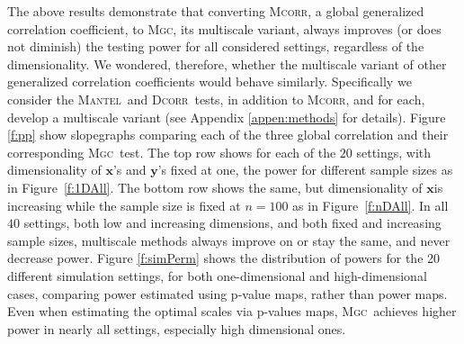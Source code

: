 \documentclass[11pt]{article}
\newcommand{\note}[2][]{\added[#1,remark={#2}]{}}
\providecommand{\sct}[1]{{\normalfont\textsc{#1}}}
\providecommand{\mb}[1]{\boldsymbol{#1}}
\newcommand{\Mgc}{\sct{Mgc}}
\newcommand{\Hhg}{\sct{Hhg}}
\newcommand{\Dcorr}{\sct{Dcorr}}
\newcommand{\Mcorr}{\sct{Mcorr}}
\newcommand{\Mantel}{\sct{Mantel}}
\newcommand{\cs}[1]{{\note{cs: #1}}}
\newcommand{\mbx}{\ensuremath{\mb{x}}}
\newcommand{\mby}{\ensuremath{\mb{y}}}
\begin{document}
The above results demonstrate that converting \Mcorr, a global generalized correlation coefficient, to \Mgc, its multiscale variant, always improves (or does not diminish) the testing power for all considered settings, regardless of the dimensionality.  We wondered, therefore, whether the multiscale variant of other generalized correlation coefficients would behave similarly.  Specifically we consider the \Mantel~and \Dcorr~tests, in addition to \Mcorr, and for each, develop a multiscale variant (see Appendix \ref{appen:methods} for details). 
% 
Figure \ref{f:pp} show slopegraphs comparing each of the three global correlation and their corresponding \Mgc~test.  The top row shows for each of the $20$ settings, with dimensionality of \mbx's and \mby's  fixed at one, the  power for different sample sizes as in Figure~\ref{f:1DAll}.  The bottom row shows the same, but   dimensionality of \mbx is increasing while the sample size is fixed at $n=100$ as in Figure~\ref{f:nDAll}.  In all $40$ settings, both low and increasing dimensions, and both fixed and increasing sample sizes, multiscale methods always improve on or stay the same, and never decrease power. 
Figure \ref{f:simPerm} shows the distribution of powers for the 20 different simulation settings, for both one-dimensional and high-dimensional cases, comparing power estimated using p-value maps, rather than power maps.  
Even when estimating the optimal scales via p-values maps, \Mgc~achieves higher power in nearly all settings, especially high dimensional ones.
\cs{i moved the above sentence here}
\end{document}
